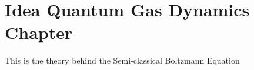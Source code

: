 %

\chapter{Idea Quantum Gas Dynamics Chapter}

This is the theory behind the Semi-classical Boltzmann Equation

%
